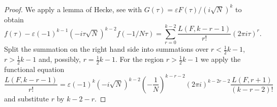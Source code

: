 \begin{proof}
    We apply a lemma of Hecke, see \cite[Section 5]{weil1977remarks} with $G(\tau) = \varepsilon F(\tau) / (i \sqrt{N})^k$ to obtain
    $$
        f(\tau) - \varepsilon(-1)^{k-1} (-i \tau \sqrt{N})^{k-2} f(-1/N\tau) = \sum_{r = 0}^{k-2} \frac{L(F, k - r - 1)}{r!} (2 \pi i \tau)^r.
    $$
    Split the summation on the right hand side into summations over $r < \frac{1}{2}k - 1$, $r > \frac{1}{2}k - 1$ and,
    possibly, $r = \frac{1}{2}k - 1$.
    For the region $r > \frac{1}{2}k - 1$ we apply the functional equation
    $$
        \frac{L(F, k - r - 1)}{r!} = \varepsilon (-1)^{k} (-i\sqrt{N})^{k-2} \left(-\frac{1}{N}\right)^{k-r-2} (2 \pi i )^{k- 2r - 2} \frac{L(F, r + 1)}{(k - r - 2)!}
    $$
    and substitute $r$ by $k - 2 - r$.
\end{proof}
